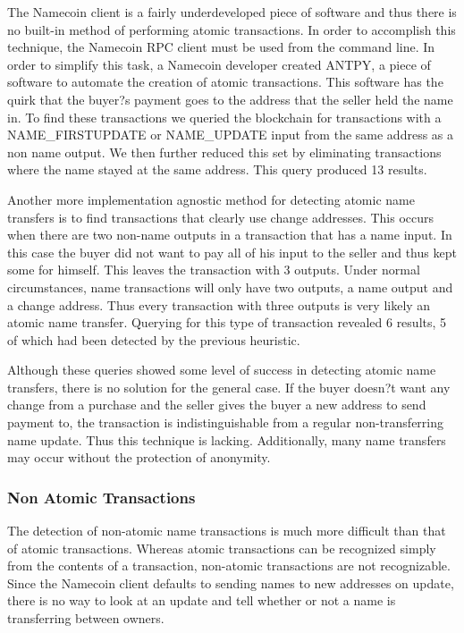 The Namecoin client is a fairly underdeveloped piece of software and thus there is no built-in method of performing atomic transactions. In order to accomplish this technique, the Namecoin RPC client must be used from the command line. In order to simplify this task, a Namecoin developer created ANTPY, a piece of software to automate the creation of atomic transactions. This software has the quirk that the buyer?s payment goes to the address that the seller held the name in. To find these transactions we queried the blockchain for transactions with a NAME\_FIRSTUPDATE or NAME\_UPDATE input from the same address as a non name output. We then further reduced this set by eliminating transactions where the name stayed at the same address. This query produced 13 results.

Another more implementation agnostic method for detecting atomic name transfers is to find transactions that clearly use change addresses. This occurs when there are two non-name outputs in a transaction that has a name input. In this case the buyer did not want to pay all of his input to the seller and thus kept some for himself. This leaves the transaction with 3 outputs. Under normal circumstances, name transactions will only have two outputs, a name output and a change address. Thus every transaction with three outputs is very likely an atomic name transfer. Querying for this type of transaction revealed 6 results, 5 of which had been detected by the previous heuristic.

Although these queries showed some level of success in detecting atomic name transfers, there is no solution for the general case. If the buyer doesn?t want any change from a purchase and the seller gives the buyer a new address to send payment to, the transaction is indistinguishable from a regular non-transferring name update. Thus this technique is lacking. Additionally, many name transfers may occur without the protection of anonymity.

\subsubsection{Non Atomic Transactions}

The detection of non-atomic name transactions is much more difficult than that of atomic transactions. Whereas atomic transactions can be recognized simply from the contents of a transaction, non-atomic transactions are not recognizable.  Since the Namecoin client defaults to sending names to new addresses on update, there is no way to look at an update and tell whether or not a name is transferring between owners.

